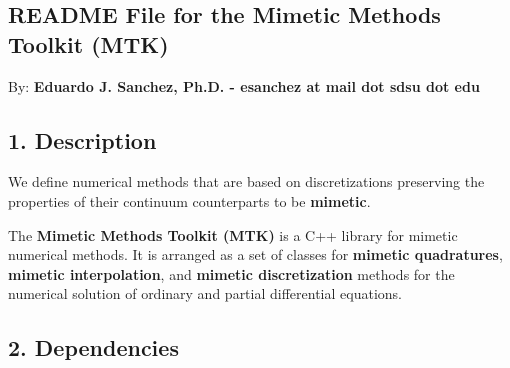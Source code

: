 
\begin{DoxyPre}
\section*{README File for the Mimetic Methods Toolkit (MTK)}\end{DoxyPre}



\begin{DoxyPre}\end{DoxyPre}



\begin{DoxyPre}By: {\bfseries Eduardo J. Sanchez, Ph.D. - esanchez at mail dot sdsu dot edu}


\end{DoxyPre}



\begin{DoxyPre}\subsection*{1. Description}\end{DoxyPre}



\begin{DoxyPre}\end{DoxyPre}



\begin{DoxyPre}We define numerical methods that are based on discretizations preserving the
properties of their continuum counterparts to be {\bfseries mimetic}.\end{DoxyPre}



\begin{DoxyPre}The {\bfseries Mimetic Methods Toolkit (MTK)} is a C++ library for mimetic numerical
methods. It is arranged as a set of classes for {\bfseries mimetic quadratures},
{\bfseries mimetic interpolation}, and {\bfseries mimetic discretization} methods for the
numerical solution of ordinary and partial differential equations.


\end{DoxyPre}



\begin{DoxyPre}\subsection*{2. Dependencies}\end{DoxyPre}



